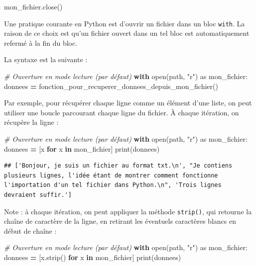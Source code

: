 \documentclass[12pt,]{book}
\newenvironment{Shaded}{\begin{snugshade}}{\end{snugshade}}
\newcommand{\KeywordTok}[1]{\textcolor[rgb]{0.13,0.29,0.53}{\textbf{#1}}}
\newcommand{\StringTok}[1]{\textcolor[rgb]{0.31,0.60,0.02}{#1}}
\newcommand{\ImportTok}[1]{#1}
\newcommand{\CommentTok}[1]{\textcolor[rgb]{0.56,0.35,0.01}{\textit{#1}}}
\newcommand{\ControlFlowTok}[1]{\textcolor[rgb]{0.13,0.29,0.53}{\textbf{#1}}}
\newcommand{\OperatorTok}[1]{\textcolor[rgb]{0.81,0.36,0.00}{\textbf{#1}}}
\newcommand{\BuiltInTok}[1]{#1}
\newcommand{\NormalTok}[1]{#1}
\numberwithin{equation}{section}
\numberwithin{countremarque}{section}
\begin{document}
\begin{Shaded}
\begin{Highlighting}[]
\NormalTok{mon_fichier.close()}
\end{Highlighting}
\end{Shaded}

Une pratique courante en Python est d'ouvrir un fichier dans un bloc
\texttt{with}. La raison de ce choix est qu'un fichier ouvert dans un
tel bloc est automatiquement refermé à la fin du bloc.

La syntaxe est la suivante :

\begin{Shaded}
\begin{Highlighting}[]
\CommentTok{# Ouverture en mode lecture (par défaut)}
\ControlFlowTok{with} \BuiltInTok{open}\NormalTok{(path, }\StringTok{"r"}\NormalTok{) }\ImportTok{as}\NormalTok{ mon_fichier:}
\NormalTok{  donnees }\OperatorTok{=}\NormalTok{ fonction_pour_recuperer_donnees_depuis_mon_fichier()}
\end{Highlighting}
\end{Shaded}

Par exemple, pour récupérer chaque ligne comme un élément d'une liste,
on peut utiliser une boucle parcourant chaque ligne du fichier. À chaque
itération, on récupère la ligne :

\begin{Shaded}
\begin{Highlighting}[]
\CommentTok{# Ouverture en mode lecture (par défaut)}
\ControlFlowTok{with} \BuiltInTok{open}\NormalTok{(path, }\StringTok{"r"}\NormalTok{) }\ImportTok{as}\NormalTok{ mon_fichier:}
\NormalTok{  donnees }\OperatorTok{=}\NormalTok{ [x }\ControlFlowTok{for}\NormalTok{ x }\KeywordTok{in}\NormalTok{ mon_fichier]}
\BuiltInTok{print}\NormalTok{(donnees)}
\end{Highlighting}
\end{Shaded}

\begin{lstlisting}
## ['Bonjour, je suis un fichier au format txt.\n', "Je contiens plusieurs lignes, l'idée étant de montrer comment fonctionne l'importation d'un tel fichier dans Python.\n", 'Trois lignes devraient suffir.']
\end{lstlisting}

Note : à chaque itération, on peut appliquer la méthode
\texttt{strip()}, qui retourne la chaîne de caractère de la ligne, en
retirant les éventuels caractères blancs en début de chaîne :

\begin{Shaded}
\begin{Highlighting}[]
\CommentTok{# Ouverture en mode lecture (par défaut)}
\ControlFlowTok{with} \BuiltInTok{open}\NormalTok{(path, }\StringTok{"r"}\NormalTok{) }\ImportTok{as}\NormalTok{ mon_fichier:}
\NormalTok{  donnees }\OperatorTok{=}\NormalTok{ [x.strip() }\ControlFlowTok{for}\NormalTok{ x }\KeywordTok{in}\NormalTok{ mon_fichier]}
\BuiltInTok{print}\NormalTok{(donnees)}
\end{Highlighting}
\end{Shaded}
\end{document}
